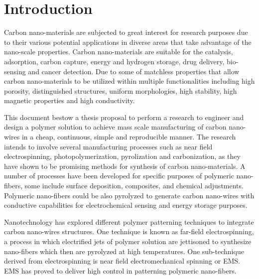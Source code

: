 
\chapter{Introduction} %

\label{Chapter:Introduction}

Carbon nano-materials are subjected to great interest for research purposes due to their various potential applications in diverse areas that take advantage of the nano-scale properties. \cite{Siddiqui2019} Carbon nano-materials are suitable for the catalysis, adsorption, carbon capture, energy and hydrogen storage, drug delivery, bio-sensing and cancer detection. \cite{Siddiqui2019} Due to some of matchless properties that allow carbon nano-materials to be utilized within multiple functionalities including high porosity, distinguished structures, uniform morphologies, high stability, high magnetic properties and high conductivity. \cite{Siddiqui2019}


This document bestow a thesis proposal to perform a research to engineer and design a polymer solution to achieve mass scale manufacturing of carbon nano-wires in a cheap, continuous, simple and reproducible manner. The research intends to involve several manufacturing processes such as near field electrospinning, photopolymerization, pyrolization and carbonization, as they have shown to be promising methods for synthesis of carbon nano-materials. \cite{Cardenas2017} A number of processes have been developed for specific purposes of polymeric nano-fibers, some include surface deposition, composites, and chemical adjustments. Polymeric nano-fibers could be also pyrolyzed to generate carbon nano-wires with conductive capabilities \cite{Madou2011} for electrochemical sensing and energy storage purposes.

Nanotechnology has explored different polymer patterning techniques to integrate carbon nano-wires structures. One technique is known as far-field electrospinning, a process in which electrified jets of polymer solution are jettisoned to synthesize nano-fibers which then are pyrolyzed at high temperatures. One sub-technique derived from electrospinning is near field electromechanical spinning or EMS. EMS has proved to deliver high control in patterning polymeric nano-fibers. \cite{Cardenas2017}

